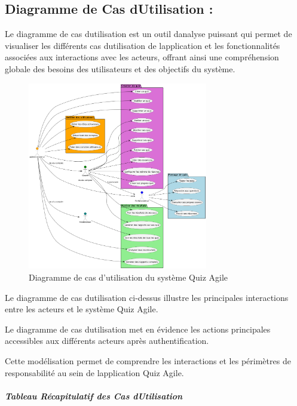 \documentclass[12pt,a4paper,twoside,openright]{report}
\begin{document}
\hypertarget{diagramme-de-cas-dutilisation}{%
\subsection{Diagramme de Cas d\textquotesingle Utilisation
:}\label{diagramme-de-cas-dutilisation}}

Le diagramme de cas d\textquotesingle utilisation est un outil
d\textquotesingle analyse puissant qui permet de visualiser les
différents cas d\textquotesingle utilisation de
l\textquotesingle application et les fonctionnalités associées aux
interactions avec les acteurs, offrant ainsi une compréhension globale
des besoins des utilisateurs et des objectifs du système.

\begin{figure}[htbp]
    \centering
    \includegraphics[width=0.7\textwidth]{latex_media/media/image14.png}
    \caption{Diagramme de cas d'utilisation du système Quiz Agile}
    \label{fig:cas-utilisation}
\end{figure}

Le diagramme de cas d\textquotesingle utilisation ci-dessus illustre les principales interactions entre les acteurs et le système Quiz Agile.

Le diagramme de cas d\textquotesingle utilisation met en évidence les
actions principales accessibles aux différents acteurs après
authentification.

Cette modélisation permet de comprendre les interactions et les
périmètres de responsabilité au sein de l\textquotesingle application
Quiz Agile.

\hypertarget{tableau-ruxe9capitulatif-des-cas-dutilisation}{%
\subparagraph{Tableau Récapitulatif des Cas
d\textquotesingle Utilisation}\label{tableau-ruxe9capitulatif-des-cas-dutilisation}}
\end{document}
